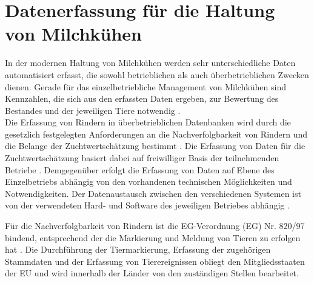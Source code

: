 
\chapter{Datenerfassung für die Haltung von Milchkühen}
In der modernen Haltung von Milchkühen werden sehr unterschiedliche Daten automatisiert erfasst, die sowohl betrieblichen als auch überbetrieblichen Zwecken dienen. Gerade für das einzelbetriebliche Management von Milchkühen sind Kennzahlen, die sich aus den erfassten Daten ergeben, zur Bewertung des Bestandes und der jeweiligen Tiere notwendig \autocite[261]{bostedt_fruchtbarkeitsmanagement_2003}.\\
Die Erfassung von Rindern in überbetrieblichen Datenbanken wird durch die gesetzlich festgelegten Anforderungen an die Nachverfolgbarkeit von Rindern und die Belange der Zuchtwertschätzung bestimmt \autocite[716]{de_vries_m._exploring_2014}. Die Erfassung von Daten für die Zuchtwertschätzung basiert dabei auf freiwilliger Basis der teilnehmenden Betriebe \autocite[716]{de_vries_m._exploring_2014}. Demgegenüber erfolgt die Erfassung von Daten auf Ebene des Einzelbetriebs abhängig von den vorhandenen technischen Möglichkeiten und Notwendigkeiten. Der Datenaustausch zwischen den verschiedenen Systemen ist von der verwendeten Hard- und Software des jeweiligen Betriebes abhängig \autocite[4]{schulze_c._hybride_2008}.
\par \noindent Für die Nachverfolgbarkeit von Rindern ist die EG-Verordnung (EG) Nr. 820/97 bindend, entsprechend der die Markierung und Meldung von Tieren zu erfolgen hat \autocite{hi-tier_rinder-datenbank_2015}. Die Durchführung der Tiermarkierung, Erfassung der zugehörigen Stammdaten und der Erfassung von Tierereignissen obliegt den Mitgliedsstaaten der EU und wird innerhalb der Länder von den zuständigen Stellen bearbeitet. 

